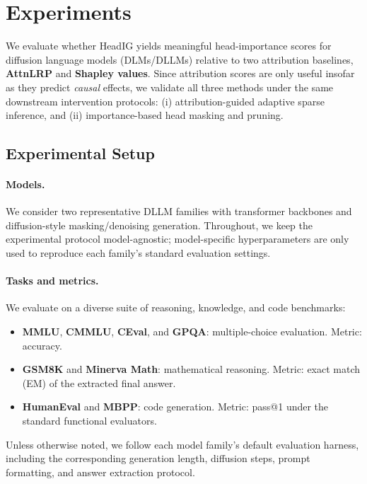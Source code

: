 \section{Experiments}
\label{sec:experiments}

We evaluate whether HeadIG yields meaningful head-importance scores for diffusion language models (DLMs/DLLMs) relative to two attribution baselines, \textbf{AttnLRP} and \textbf{Shapley values}. Since attribution scores are only useful insofar as they predict \emph{causal} effects, we validate all three methods under the same downstream intervention protocols: (i) attribution-guided adaptive sparse inference, and (ii) importance-based head masking and pruning.

\subsection{Experimental Setup}
\label{sec:exp:setup}

\paragraph{Models.}
We consider two representative DLLM families with transformer backbones and diffusion-style masking/denoising generation. Throughout, we keep the experimental protocol model-agnostic; model-specific hyperparameters are only used to reproduce each family’s standard evaluation settings.

\paragraph{Tasks and metrics.}
We evaluate on a diverse suite of reasoning, knowledge, and code benchmarks:
\begin{itemize}
    \item \textbf{MMLU}, \textbf{CMMLU}, \textbf{CEval}, and \textbf{GPQA}: multiple-choice evaluation. Metric: accuracy.
    \item \textbf{GSM8K} and \textbf{Minerva Math}: mathematical reasoning. Metric: exact match (EM) of the extracted final answer.
    \item \textbf{HumanEval} and \textbf{MBPP}: code generation. Metric: pass@1 under the standard functional evaluators.
\end{itemize}
Unless otherwise noted, we follow each model family’s default evaluation harness, including the corresponding generation length, diffusion steps, prompt formatting, and answer extraction protocol.

